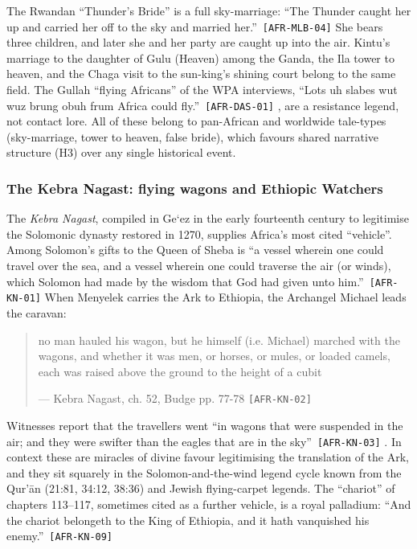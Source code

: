 \documentclass[11pt,a4paper]{article}
\newcommand{\pid}[1]{\texttt{\small #1}}
\begin{document}
The Rwandan ``Thunder's Bride'' is a full sky-marriage: \enquote{The Thunder caught her up and carried her off to the sky and married her.}~\pid{[AFR-MLB-04]} She bears three children, and later she and her party are caught up into the air. Kintu's marriage to the daughter of Gulu (Heaven) among the Ganda, the Ila tower to heaven, and the Chaga visit to the sun-king's shining court belong to the same field. The Gullah ``flying Africans'' of the WPA interviews, \enquote{Lots uh slabes wut wuz brung obuh frum Africa could fly.}~\pid{[AFR-DAS-01]} \parencite{wpa1940drums}, are a resistance legend, not contact lore. All of these belong to pan-African and worldwide tale-types (sky-marriage, tower to heaven, false bride), which favours shared narrative structure (H3) over any single historical event.

\subsubsection{The Kebra Nagast: flying wagons and Ethiopic Watchers}

The \emph{Kebra Nagast}, compiled in Ge`ez in the early fourteenth century to legitimise the Solomonic dynasty restored in 1270, supplies Africa's most cited ``vehicle''. Among Solomon's gifts to the Queen of Sheba is \enquote{a vessel wherein one could travel over the sea, and a vessel wherein one could traverse the air (or winds), which Solomon had made by the wisdom that God had given unto him.}~\pid{[AFR-KN-01]} When Menyelek carries the Ark to Ethiopia, the Archangel Michael leads the caravan: 
\begin{quote}\small no man hauled his wagon, but he himself (i.e. Michael) marched with the wagons, and whether it was men, or horses, or mules, or loaded camels, each was raised above the ground to the height of a cubit\par\hfill{\footnotesize --- Kebra Nagast, ch. 52, Budge pp. 77-78 \pid{[AFR-KN-02]}}\end{quote}
 Witnesses report that the travellers went \enquote{in wagons that were suspended in the air; and they were swifter than the eagles that are in the sky}~\pid{[AFR-KN-03]} \parencite{budge1922kebra}. In context these are miracles of divine favour legitimising the translation of the Ark, and they sit squarely in the Solomon-and-the-wind legend cycle known from the Qur'ān (21:81, 34:12, 38:36) and Jewish flying-carpet legends. The ``chariot'' of chapters 113--117, sometimes cited as a further vehicle, is a royal palladium: \enquote{And the chariot belongeth to the King of Ethiopia, and it hath vanquished his enemy.}~\pid{[AFR-KN-09]}
\end{document}
